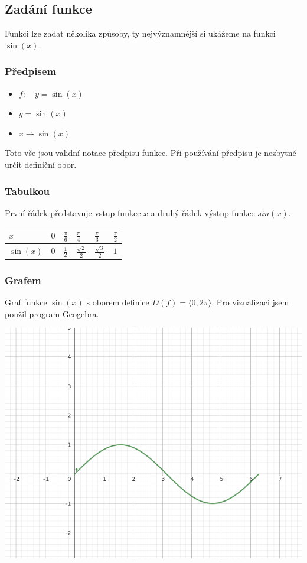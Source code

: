 \documentclass[12pt]{report}			%
\begin{document}
				\subsection{Zadání funkce}
Funkci lze zadat několika způsoby, ty nejvýznamnější si ukážeme na funkci $\sin(x)$.

					\subsubsection{Předpisem}
					\begin{itemize}
					\item $f:\quad y = \sin(x)$
					\item $y = \sin(x)$
					\item $x \to \sin(x)$
					\end{itemize}
Toto vše jsou validní notace předpisu funkce. Při používání předpisu je nezbytné určit definiční obor.
				\subsubsection{Tabulkou}
První řádek představuje vstup funkce $x$ a druhý řádek výstup funkce $sin(x)$.
\begin{center}
\begin{tabular}{ | m{1cm} | m{1cm}| m{1cm} | m{1cm} |m{1cm} |m{1cm} |} 
\hline
  $x$ & $0$ & $\frac{\pi}{6}$ & $\frac{\pi}{4}$ & $\frac{\pi}{3}$ & $\frac{\pi}{2}$ \\
\hline
	$\sin(x)$ & $0$ & $\frac{1}{2}$ & $\frac{\sqrt{2}}{2}$ & $\frac{\sqrt{3}}{2}$ & $1$ \\
\hline
\end{tabular}
\end{center}
				\subsubsection{Grafem}
Graf funkce $\sin(x)$ s oborem definice $D(f) = \langle 0, 2\pi \rangle$. Pro vizualizaci jsem použil program Geogebra.
\begin{center}
\includegraphics[scale=0.4]{./images/graf.png}
\end{center}
\end{document}
